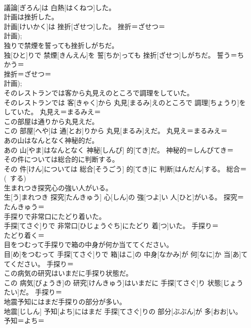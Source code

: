 \documentclass[8pt]{extreport}
\begin{document}
\begin{CJK}{UTF8}{min}
\\	議論[ぎろん]は 白熱[はくねつ]した。	
\\	計画は挫折した。	
\\	計画[けいかく]は 挫折[ざせつ]した。	挫折＝ざせつ＝ 
\\	計画); 
\\	独りで禁煙を誓っても挫折しがちだ。	
\\	独[ひと]りで 禁煙[きんえん]を 誓[ちか]っても 挫折[ざせつ]しがちだ。	誓う＝ちかう＝ 
\\	挫折＝ざせつ＝ 
\\	計画); 
\\	そのレストランでは客から丸見えのところで調理をしていた。	
\\	そのレストランでは 客[きゃく]から 丸見[まるみ]えのところで 調理[ちょうり]をしていた。	丸見え＝まるみえ＝ 
\\	この部屋は通りから丸見えだ。	
\\	この 部屋[へや]は 通[とお]りから 丸見[まるみ]えだ。	丸見え＝まるみえ＝ 
\\	あの山はなんとなく神秘的だ。	
\\	あの 山[やま]はなんとなく 神秘[しんぴ] 的[てき]だ。	神秘的＝しんぴてき＝ 
\\	その件については総合的に判断する。	
\\	その 件[けん]については 総合[そうごう] 的[てき]に 判断[はんだん]する。	総合＝ 
\\	(~する) 
\\	生まれつき探究心の強い人がいる。	
\\	生[う]まれつき 探究[たんきゅう] 心[しん]の 強[つよ]い 人[ひと]がいる。	探究＝たんきゅう＝ 
\\	手探りで非常口にたどり着いた。	
\\	手探[てさぐ]りで 非常口[ひじょうぐち]にたどり 着[つ]いた。	手探り＝ 
\\	たどり着く＝ 
\\	目をつむって手探りで箱の中身が何か当ててください。	
\\	目[め]をつむって 手探[てさぐ]りで 箱[はこ]の 中身[なかみ]が 何[なに]か 当[あ]ててください。	手探り＝ 
\\	この病気の研究はいまだに手探り状態だ。	
\\	この 病気[びょうき]の 研究[けんきゅう]はいまだに 手探[てさぐ]り 状態[じょうたい]だ。	手探り＝ 
\\	地震予知にはまだ手探りの部分が多い。	
\\	地震[じしん] 予知[よち]にはまだ 手探[てさぐ]りの 部分[ぶぶん]が 多[おお]い。	予知＝よち＝ 

\end{CJK}
\end{document}

